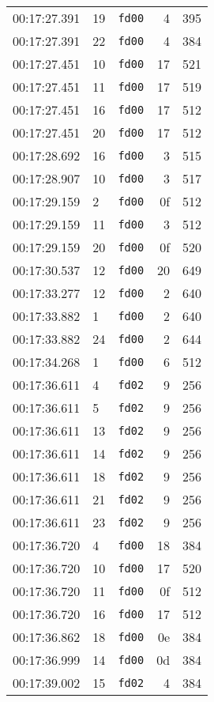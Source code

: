 \documentclass{article}
\begin{document}
\begin{longtable}{lllrr}
00:17:27.391 & 19 & \texttt{fd00} & 4 & 395 \\
00:17:27.391 & 22 & \texttt{fd00} & 4 & 384 \\
00:17:27.451 & 10 & \texttt{fd00} & 17 & 521 \\
00:17:27.451 & 11 & \texttt{fd00} & 17 & 519 \\
00:17:27.451 & 16 & \texttt{fd00} & 17 & 512 \\
00:17:27.451 & 20 & \texttt{fd00} & 17 & 512 \\
00:17:28.692 & 16 & \texttt{fd00} & 3 & 515 \\
00:17:28.907 & 10 & \texttt{fd00} & 3 & 517 \\
00:17:29.159 & 2 & \texttt{fd00} & 0f & 512 \\
00:17:29.159 & 11 & \texttt{fd00} & 3 & 512 \\
00:17:29.159 & 20 & \texttt{fd00} & 0f & 520 \\
00:17:30.537 & 12 & \texttt{fd00} & 20 & 649 \\
00:17:33.277 & 12 & \texttt{fd00} & 2 & 640 \\
00:17:33.882 & 1 & \texttt{fd00} & 2 & 640 \\
00:17:33.882 & 24 & \texttt{fd00} & 2 & 644 \\
00:17:34.268 & 1 & \texttt{fd00} & 6 & 512 \\
00:17:36.611 & 4 & \texttt{fd02} & 9 & 256 \\
00:17:36.611 & 5 & \texttt{fd02} & 9 & 256 \\
00:17:36.611 & 13 & \texttt{fd02} & 9 & 256 \\
00:17:36.611 & 14 & \texttt{fd02} & 9 & 256 \\
00:17:36.611 & 18 & \texttt{fd02} & 9 & 256 \\
00:17:36.611 & 21 & \texttt{fd02} & 9 & 256 \\
00:17:36.611 & 23 & \texttt{fd02} & 9 & 256 \\
00:17:36.720 & 4 & \texttt{fd00} & 18 & 384 \\
00:17:36.720 & 10 & \texttt{fd00} & 17 & 520 \\
00:17:36.720 & 11 & \texttt{fd00} & 0f & 512 \\
00:17:36.720 & 16 & \texttt{fd00} & 17 & 512 \\
00:17:36.862 & 18 & \texttt{fd00} & 0e & 384 \\
00:17:36.999 & 14 & \texttt{fd00} & 0d & 384 \\
00:17:39.002 & 15 & \texttt{fd02} & 4 & 384 \\

\end{longtable}
\end{document}
